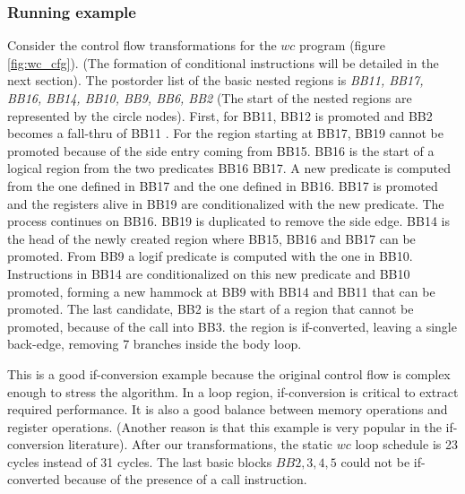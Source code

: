 \subsubsection{Running example}
Consider the control flow transformations for the $wc$ program (figure \ref{fig:wc_cfg}).
(The formation of conditional instructions will be detailed in the next section).
 The postorder list of the basic nested regions is {\em BB11, BB17, BB16, BB14, BB10, BB9, BB6, BB2} (The start of the nested regions are represented by the circle nodes). First, for BB11, BB12 is promoted and BB2 becomes a fall-thru of BB11 . For the region starting at BB17, BB19 cannot be promoted because of the side entry coming from BB15. BB16 is the start of a logical region from the two predicates BB16 BB17. A new predicate is computed from the one defined in BB17 and the one defined in BB16. BB17 is promoted and the registers alive in BB19 are conditionalized with the new predicate. The process continues on BB16. BB19 is duplicated to remove the side edge. BB14 is the head of the newly created region where BB15, BB16 and BB17 can be promoted. From BB9 a logif predicate is computed with the one in BB10. Instructions in BB14 are conditionalized on this new predicate and BB10 promoted, forming a new hammock at BB9 with BB14 and BB11 that can be promoted. The last candidate, BB2 is the start of a region that cannot be promoted, because of the call into BB3. the region is if-converted, leaving a single back-edge, removing 7 branches inside the body loop.

This is a good if-conversion example because the original control flow is complex enough to stress the algorithm. In a loop region, if-conversion is critical to extract required performance. It is also a good balance between
 memory operations and register operations. (Another reason is that this example is very popular in the if-conversion literature). 
After our transformations, the static $wc$ loop schedule is 23 cycles instead of 31 cycles. The last basic blocks $BB2,3,4,5$ could not be if-converted because of the presence of a call instruction.

